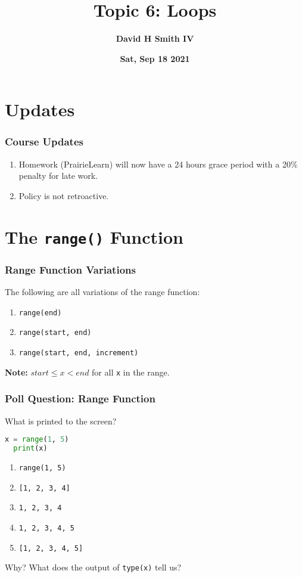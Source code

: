 \documentclass{beamer}
\title{\textbf{Topic 6: Loops}}
\author{\textbf{David H Smith IV}}
\institute[\textbf{UIUC}]{\textbf{University of Illinois Urbana-Champaign}}
\date{\textbf{Sat, Sep 18 2021}}
\begin{document}
\section{Updates}

%
%
\begin{frame}[fragile]
  \frametitle{Course Updates}
  \begin{enumerate}[A]
    \item Homework (PrairieLearn) will now have a 24 hours grace period with a 20\% penalty for late work.
    \item Policy is not retroactive.
  \end{enumerate}
\end{frame}



\frame{\titlepage}

\section{The \lstinline|range()| Function}

%
%
\begin{frame}[fragile]
  \frametitle{Range Function Variations}
  The following are all variations of the range function:
  \begin{enumerate}[A]
    \item \lstinline|range(end)|
    \item \lstinline|range(start, end)|
    \item \lstinline|range(start, end, increment)|
  \end{enumerate}
  \vfill
  \textbf{Note: } $start \leq x < end$ for all \lstinline|x| in the range.
\end{frame}

%
%
\begin{frame}[fragile]
  \frametitle{Poll Question: Range Function}
  What is printed to the screen?
  \begin{lstlisting}[language=Python, autogobble]
  x = range(1, 5)
  print(x)
  \end{lstlisting}
  \vfill
  \begin{enumerate}[A]
    \item \lstinline|range(1, 5)|
    \item \lstinline|[1, 2, 3, 4]|
    \item \lstinline|1, 2, 3, 4|
    \item \lstinline|1, 2, 3, 4, 5|
    \item \lstinline|[1, 2, 3, 4, 5]|
  \end{enumerate}
  \vfill \pause
  Why? What does the output of \lstinline|type(x)| tell us?
\end{frame}
\end{document}
